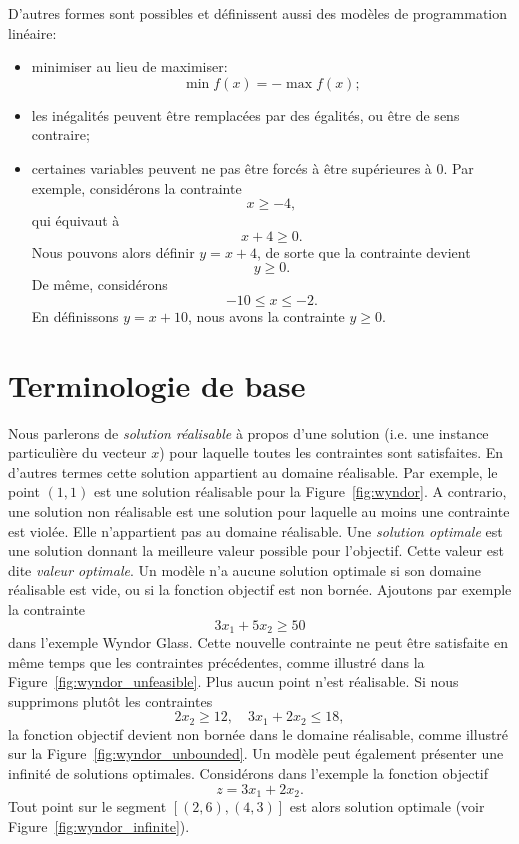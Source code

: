 D'autres formes sont possibles et définissent aussi des modèles de programmation linéaire:
\begin{itemize}
\item
minimiser au lieu de maximiser:
\[
\min f(x) = -\max f(x);
\]
\item
les inégalités peuvent être remplacées par des égalités, ou être de sens contraire;
\item
certaines variables peuvent ne pas être forcés à être supérieures à 0. Par exemple, considérons la contrainte
\[
x \geq -4,
\]
qui équivaut à
\[
x + 4 \geq 0.
\]
Nous pouvons alors définir $y = x+4$, de sorte que la contrainte devient
\[
y \geq 0.
\]
De même, considérons
\[
-10 \leq x \leq -2.
\]
En définissons $y = x+10$, nous avons la contrainte $y \geq 0$.
\end{itemize}

\section{Terminologie de base}

Nous parlerons de {\sl solution réalisable} à propos d'une solution (i.e. une instance particulière du vecteur $x$) pour laquelle toutes les contraintes sont satisfaites.
En d'autres termes cette solution appartient au domaine réalisable.
Par exemple, le point $(1,1)$ est une solution réalisable pour la Figure~\ref{fig:wyndor}.
A contrario, une solution non réalisable est une solution pour laquelle au moins une contrainte est violée. Elle n'appartient pas au domaine réalisable.
Une {\sl solution optimale} est une solution donnant la meilleure valeur possible pour l'objectif. Cette valeur est dite {\sl valeur optimale}.
Un modèle n'a aucune solution optimale si son domaine réalisable est vide, ou si la fonction objectif est non bornée.
Ajoutons par exemple la contrainte
\[
3x_1 + 5x_2 \geq 50
\]
dans l'exemple Wyndor Glass.
Cette nouvelle contrainte ne peut être satisfaite en même temps que les contraintes précédentes, comme illustré dans la Figure~\ref{fig:wyndor_unfeasible}.
Plus aucun point n'est réalisable.
Si nous supprimons plutôt les contraintes
\[
2x_2 \geq 12,\quad 3x_1 + 2x_2 \leq 18,
\]
la fonction objectif devient non bornée dans le domaine réalisable, comme illustré sur la Figure~\ref{fig:wyndor_unbounded}.
Un modèle peut également présenter une infinité de solutions optimales.
Considérons dans l'exemple la fonction objectif
\[
z = 3x_1 + 2x_2.
\]
Tout point sur le segment $[(2,6),(4,3)]$ est alors solution optimale (voir Figure~\ref{fig:wyndor_infinite}).

